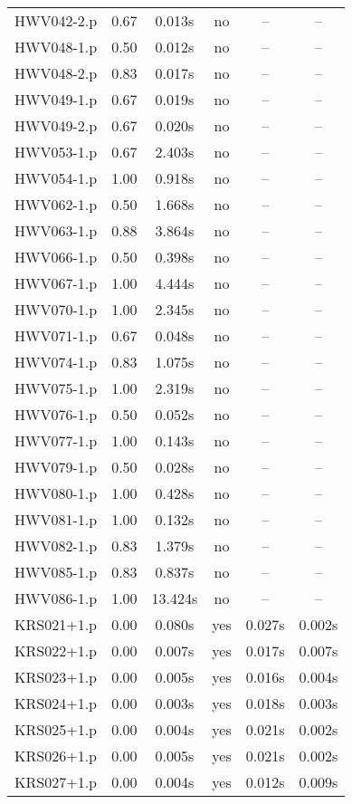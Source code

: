 \begin{center}
\begin{longtable}{||c | c | c | c | c | c||}
HWV042-2.p & 0.67 & 0.013s & no & -- & -- \\
HWV048-1.p & 0.50 & 0.012s & no & -- & -- \\
HWV048-2.p & 0.83 & 0.017s & no & -- & -- \\
HWV049-1.p & 0.67 & 0.019s & no & -- & -- \\
HWV049-2.p & 0.67 & 0.020s & no & -- & -- \\
HWV053-1.p & 0.67 & 2.403s & no & -- & -- \\
HWV054-1.p & 1.00 & 0.918s & no & -- & -- \\
HWV062-1.p & 0.50 & 1.668s & no & -- & -- \\
HWV063-1.p & 0.88 & 3.864s & no & -- & -- \\
HWV066-1.p & 0.50 & 0.398s & no & -- & -- \\
HWV067-1.p & 1.00 & 4.444s & no & -- & -- \\
HWV070-1.p & 1.00 & 2.345s & no & -- & -- \\
HWV071-1.p & 0.67 & 0.048s & no & -- & -- \\
HWV074-1.p & 0.83 & 1.075s & no & -- & -- \\
HWV075-1.p & 1.00 & 2.319s & no & -- & -- \\
HWV076-1.p & 0.50 & 0.052s & no & -- & -- \\
HWV077-1.p & 1.00 & 0.143s & no & -- & -- \\
HWV079-1.p & 0.50 & 0.028s & no & -- & -- \\
HWV080-1.p & 1.00 & 0.428s & no & -- & -- \\
HWV081-1.p & 1.00 & 0.132s & no & -- & -- \\
HWV082-1.p & 0.83 & 1.379s & no & -- & -- \\
HWV085-1.p & 0.83 & 0.837s & no & -- & -- \\
HWV086-1.p & 1.00 & 13.424s & no & -- & -- \\
KRS021+1.p & 0.00 & 0.080s & yes & 0.027s & 0.002s \\
KRS022+1.p & 0.00 & 0.007s & yes & 0.017s & 0.007s \\
KRS023+1.p & 0.00 & 0.005s & yes & 0.016s & 0.004s \\
KRS024+1.p & 0.00 & 0.003s & yes & 0.018s & 0.003s \\
KRS025+1.p & 0.00 & 0.004s & yes & 0.021s & 0.002s \\
KRS026+1.p & 0.00 & 0.005s & yes & 0.021s & 0.002s \\
KRS027+1.p & 0.00 & 0.004s & yes & 0.012s & 0.009s \\

\end{longtable}
\end{center}

